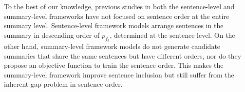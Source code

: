 To the best of our knowledge, previous studies in both the sentence-level and summary-level frameworks have not focused on sentence order at the entire summary level. Sentence-level framework models arrange sentences in the summary in descending order of $p_{f_{\theta}}$, determined at the sentence level. On the other hand, summary-level framework models do not generate candidate summaries that share the same sentences but have different orders, nor do they propose an objective function to train the sentence order. This makes the summary-level framework improve sentence inclusion but still suffer from the inherent gap problem in sentence order.

